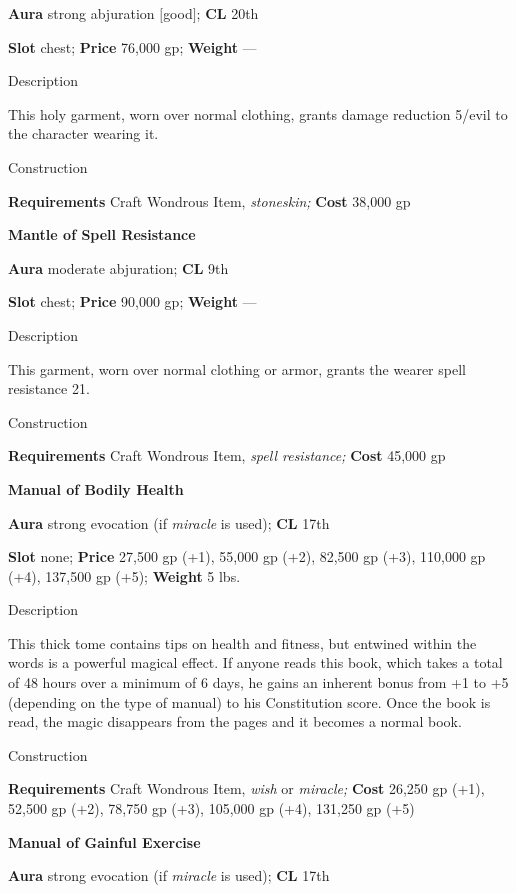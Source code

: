 \textbf{Aura} strong abjuration \mbox{$[$}good\mbox{$]$};\textbf{ CL }20th
				
\textbf{Slot} chest; \textbf{Price} 76,000 gp; \textbf{Weight }---
				
Description
				
This holy garment, worn over normal clothing, grants damage reduction 5/evil to the character wearing it. 
				
Construction
				
\textbf{Requirements} Craft Wondrous Item,\textit{ stoneskin;}\textbf{ Cost }38,000 gp
				
\textbf{Mantle of Spell Resistance}
				
\textbf{Aura} moderate abjuration;\textbf{ CL }9th
				
\textbf{Slot} chest; \textbf{Price} 90,000 gp; \textbf{Weight }---
				
Description
				
This garment, worn over normal clothing or armor, grants the wearer spell resistance 21. 
				
Construction
				
\textbf{Requirements} Craft Wondrous Item,\textit{ spell resistance;}\textbf{ Cost }45,000 gp
				
\textbf{Manual of Bodily Health}
				
\textbf{Aura} strong evocation (if \textit{miracle} is used);\textbf{ CL }17th
				
\textbf{Slot} none; \textbf{Price} 27,500 gp (+1), 55,000 gp (+2), 82,500 gp (+3), 110,000 gp (+4), 137,500 gp (+5); \textbf{Weight} 5 lbs.
				
Description
				
This thick tome contains tips on health and fitness, but entwined within the words is a powerful magical effect. If anyone reads this book, which takes a total of 48 hours over a minimum of 6 days, he gains an inherent bonus from +1 to +5 (depending on the type of manual) to his Constitution score. Once the book is read, the magic disappears from the pages and it becomes a normal book. 
				
Construction
				
\textbf{Requirements} Craft Wondrous Item,\textit{ wish} or\textit{ miracle; }\textbf{Cost }26,250 gp (+1), 52,500 gp (+2), 78,750 gp (+3), 105,000 gp (+4), 131,250 gp (+5)
				
\textbf{Manual of Gainful Exercise}
				
\textbf{Aura} strong evocation (if \textit{miracle} is used);\textbf{ CL }17th
				
